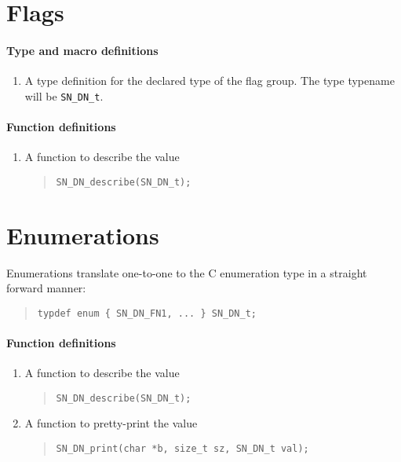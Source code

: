 \documentclass[a4paper,11pt,twoside]{report}
\begin{document}
{{\begin{enumerate}
\end{enumerate}

\section{Flags}

\paragraph{Type and macro definitions}
\begin{enumerate}
  \item A type definition for the declared type of the flag group. The 
        type typename will be \texttt{SN\_DN\_t}.
\end{enumerate}

\paragraph{Function definitions}
\begin{enumerate}
  \item A function to describe the value 
        \begin{quote}
          \texttt{SN\_DN\_describe(SN\_DN\_t);}
        \end{quote}
\end{enumerate}

\section{Enumerations}
Enumerations translate one-to-one to the C enumeration type in a straight 
forward manner:

\begin{quote}
  \texttt{typdef enum \{ SN\_DN\_FN1, ... \} SN\_DN\_t; }
\end{quote}

\paragraph{Function definitions}
\begin{enumerate}
  \item A function to describe the value 
        \begin{quote}
          \texttt{SN\_DN\_describe(SN\_DN\_t);}
        \end{quote}
  \item A function to pretty-print the value
        \begin{quote}
          \texttt{SN\_DN\_print(char *b, size\_t sz, SN\_DN\_t val);}
        \end{quote}
\end{enumerate}

}}
\end{document}
